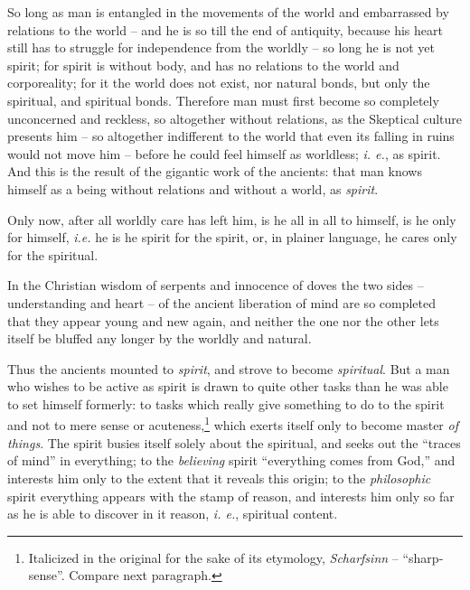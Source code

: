 \documentclass[12pt,a4paper]{book}
\begin{document}
So long as man is entangled in the movements of the world and embarrassed by 
relations to the world -- and he is so till the end of antiquity, because his 
heart still has to struggle for independence from the worldly -- so long he is 
not yet spirit; for spirit is without body, and has no relations to the world 
and corporeality; for it the world does not exist, nor natural bonds, but only 
the spiritual, and spiritual bonds. Therefore man must first become so 
completely unconcerned and reckless, so altogether without relations, as the 
Skeptical culture presents him -- so altogether indifferent to the world that 
even its falling in ruins would not move him -- before he could feel himself 
as worldless; \textit{i. e.}, as spirit. And this is the result of the 
gigantic work of the ancients: that man knows himself as a being without 
relations and without a world, as \textit{spirit}.

Only now, after all worldly care has left him, is he all in all to himself, is 
he only for himself, \textit{i.e.} he is he spirit for the spirit, or, in 
plainer language, he cares only for the spiritual.

In the Christian wisdom of serpents and innocence of doves the two sides -- 
understanding and heart -- of the ancient liberation of mind are so completed 
that they appear young and new again, and neither the one nor the other lets 
itself be bluffed any longer by the worldly and natural.

Thus the ancients mounted to \textit{spirit}, and strove to become 
\textit{spiritual}. But a man who wishes to be active as spirit is drawn to 
quite other tasks than he was able to set himself formerly: to tasks which 
really give something to do to the spirit and not to mere sense or 
acuteness,\footnote{Italicized in the original for the sake of its etymology, 
\textit{Scharfsinn} -- ``sharp-sense''. Compare next paragraph.} which 
exerts itself only to become master \textit{of things}. The spirit busies 
itself solely about the spiritual, and seeks out the ``traces of mind'' in 
everything; to the \textit{believing} spirit ``everything comes from God,'' 
and interests him only to the extent that it reveals this origin; to the 
\textit{philosophic} spirit everything appears with the stamp of reason, and 
interests him only so far as he is able to discover in it reason, \textit{i. 
e.}, spiritual content.
\end{document}

